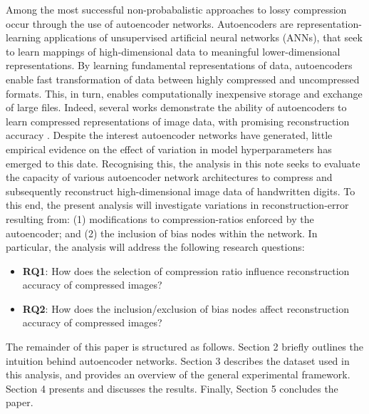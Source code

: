 Among the most successful non-probabalistic approaches to lossy compression occur through the use of autoencoder networks.
Autoencoders are representation-learning applications of unsupervised artificial neural networks (ANNs), that seek to learn mappings of high-dimensional data to meaningful lower-dimensional representations.
By learning fundamental representations of data, autoencoders enable fast transformation of data between highly compressed and uncompressed formats.
This, in turn, enables computationally inexpensive storage and exchange of large files.
Indeed, several works demonstrate the ability of autoencoders to learn compressed representations of image data, with promising reconstruction accuracy \cite{cheng2018deep, toderici2017full, balle2016end}.
Despite the interest autoencoder networks have generated, little  empirical evidence on the effect of variation in model hyperparameters has emerged to this date.
Recognising this, the analysis in this note seeks to evaluate the capacity of various autoencoder network architectures to compress and subsequently reconstruct high-dimensional image data of handwritten digits. 
To this end, the present analysis will investigate variations in reconstruction-error resulting from: (1) modifications to compression-ratios enforced by the autoencoder; and (2) the inclusion of bias nodes within the network. In particular, the analysis will address the following research questions:

\begin{itemize}
	\item[] \textbf{RQ1}: How does the selection of compression ratio influence reconstruction accuracy of compressed images?
	\item[] \textbf{RQ2}: How does the inclusion/exclusion of bias nodes affect reconstruction accuracy of compressed images?
\end{itemize}

\noindent
The remainder of this paper is structured as follows. 
Section 2 briefly outlines the intuition behind autoencoder networks.
Section 3 describes the dataset used in this analysis, and provides an overview of the general experimental framework.
Section 4 presents and discusses the results. 
Finally, Section 5 concludes the paper.



